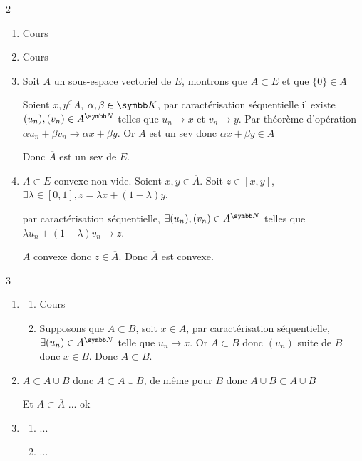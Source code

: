 \begin{correction}{2}
\begin{enumerate}
    \item Cours
    \item Cours
    \item Soit $A$ un sous-espace vectoriel de $E$, montrons que $\overline{A} \subset E$ et que $\{0\} \in \overline{A}$

        Soient $x,y^\in \overline{A}$, $\alpha,\beta \in \K$, par caractérisation séquentielle il existe $(u_n),(v_n) \in A^{\N}$ telles que $u_n \to x$ et $v_n \to y$.
        Par théorème d'opération $\alpha u_n + \beta v_n \to \alpha x + \beta y$. Or $A$ est un sev donc $\alpha x + \beta y \in \overline{A}$

        Donc $\overline{A}$ est un sev de $E$.
    
    \item $A \subset E$ convexe non vide. Soient $x,y \in \overline{A}$. Soit $z \in [x,y]$, 
        $\exists \lambda \in [0,1], z = \lambda x + (1 - \lambda)y$,

        par caractérisation séquentielle, $\exists (u_n),(v_n) \in A^{\N}$ telles que $\lambda u_n + (1 - \lambda) v_n \to z$.
        
        $A$ convexe donc $z \in \overline{A}$. Donc $\overline{A}$ est convexe.
\end{enumerate}
\end{correction}

\begin{correction}{3}
\begin{enumerate}
    \item
        \begin{enumerate}
            \item Cours
            \item Supposons que $A \subset B$, soit $x \in \overline{A}$, par caractérisation séquentielle, $\exists (u_n) \in A^{\N}$ telle que $u_n \to x$.
            Or $A \subset B$ donc $(u_n)$ suite de $B$ donc $x \in \overline{B}$. Donc $\overline{A} \subset \overline{B}$.
        \end{enumerate}

    \item $A \subset A \cup B$
        donc $\overline{A} \subset \overline{A \cup B}$, de même pour $B$
        donc $\overline{A} \cup \overline{B} \subset \overline{A \cup B}$

        Et $A \subset \overline A$ ... ok

    \item
    \begin{enumerate}
        \item ...
        \item ...
    \end{enumerate}
\end{enumerate}
\end{correction}

